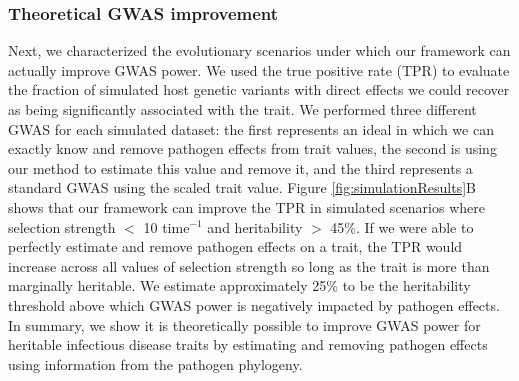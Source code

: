 \documentclass[]{article}
\begin{document}
\begin{doublespace}
\subsubsection{Theoretical GWAS improvement}

Next, we characterized the evolutionary scenarios under which our framework can actually improve GWAS power. We used the true positive rate (TPR) to evaluate the fraction of simulated host genetic variants with direct effects we could recover as being significantly associated with the trait. We performed three different GWAS for each simulated dataset: the first represents an ideal in which we can exactly know and remove pathogen effects from trait values, the second is using our method to estimate this value and remove it, and the third represents a standard GWAS using the scaled trait value. Figure \ref{fig:simulationResults}B shows that our framework can improve the TPR in simulated scenarios where selection strength $<$ 10 time$^{-1}$ and heritability $>$ 45\%. If we were able to perfectly estimate and remove pathogen effects on a trait, the TPR would increase across all values of selection strength so long as the trait is more than marginally heritable. We estimate approximately 25\% to be the heritability threshold above which GWAS power is negatively impacted by pathogen effects. In summary, we show it is theoretically possible to improve GWAS power for heritable infectious disease traits by estimating and removing pathogen effects using information from the pathogen phylogeny.



\end{doublespace}
\end{document}

